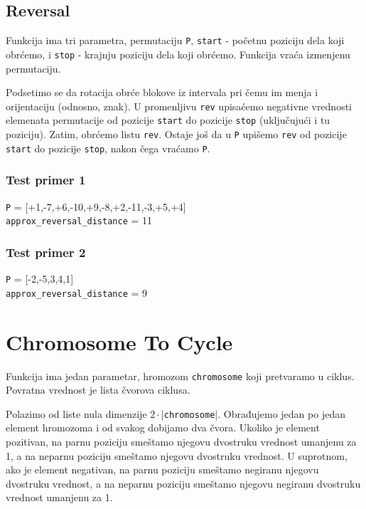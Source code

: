 

\subsection{Reversal}
\label{reversal}

Funkcija ima tri parametra, permutaciju \texttt{P}, \texttt{start} - početnu poziciju dela koji obrćemo, i \texttt{stop} - krajnju poziciju dela koji obrćemo. Funkcija vraća izmenjenu permutaciju.

Podsetimo se da rotacija obrće blokove iz intervala pri čemu im menja i orijentaciju (odnosno, znak). U promenljivu \texttt{rev} upisaćemo negativne vrednosti elemenata permutacije od pozicije \texttt{start} do pozicije \texttt{stop} (uključujući i tu poziciju). Zatim, obrćemo listu \texttt{rev}. Ostaje još da u \texttt{P} upišemo \texttt{rev} od pozicije \texttt{start} do pozicije \texttt{stop}, nakon čega vraćamo \texttt{P}.




\subsubsection{Test primer 1}

\noindent \texttt{P} = [+1,-7,+6,-10,+9,-8,+2,-11,-3,+5,+4]
\\\texttt{approx\_reversal\_distance} = 11

\subsubsection{Test primer 2}
\noindent \texttt{P} = [-2,-5,3,4,1]
\\\texttt{approx\_reversal\_distance} = 9


\section{Chromosome To Cycle}
\label{chromToCycle}

Funkcija ima jedan parametar, hromozom \texttt{chromosome} koji pretvaramo u ciklus. Povratna vrednost je lista čvorova ciklusa.

Polazimo od liste nula dimenzije $2\cdot$|\texttt{chromosome}|. Obrađujemo jedan po jedan element hromozoma i od svakog dobijamo dva čvora. Ukoliko je element pozitivan, na parnu poziciju smeštamo njegovu dvostruku vrednost umanjenu za 1, a na neparnu poziciju smeštamo njegovu dvostruku vrednost. U suprotnom, ako je element negativan, na parnu poziciju smeštamo negiranu njegovu dvostruku vrednost, a na neparnu poziciju smeštamo njegovu negiranu dvostruku vrednost umanjenu za 1.

